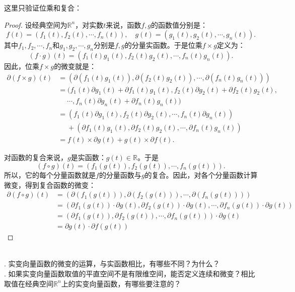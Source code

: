 \documentclass[12pt,UTF8]{ctexbook}
\begin{document}
这里只验证位乘和复合：
\begin{proof}
    设经典空间为$\mathbb{R}^n$，对实数$t$来说，函数$f,g$的函数值分别是：
    $$ f(t) = (f_1(t), f_2(t), \cdots, f_n(t)), \quad g(t) = (g_1(t), g_2(t), \cdots, g_n(t)). $$
    其中$f_1, f_2, \cdots, f_n$和$g_1, g_2, \cdots, g_n$分别是$f,g$的分量实函数。于是位乘$f \times g$定义为：
    $$ (f \cdot g)(t) = (f_1(t)g_1(t), f_2(t)g_2(t), \cdots, f_n(t)g_n(t)). $$
    因此，位乘$f\times g$的微变就是：
    \begin{align*}
        \partial (f \times g)(t) &= (\partial (f_1(t)g_1(t)), \partial (f_2(t)g_2(t)), \cdots, \partial (f_n(t)g_n(t))) \\
        &= (f_1(t)\partial g_1(t) + \partial f_1(t) g_1(t), f_2(t)\partial g_2(t) + \partial f_2(t) g_2(t), \\
        &\;\quad \cdots, f_n(t)\partial g_n(t) + \partial f_n(t) g_n(t)) \\
        &= (f_1(t)\partial g_1(t), f_2(t)\partial g_2(t), \cdots, f_n(t)\partial g_n(t)) \\
        &\;\quad + (\partial f_1(t) g_1(t), \partial f_2(t) g_2(t), \cdots, \partial f_n(t) g_n(t)) \\
        &= f(t) \times \partial g(t) + g(t) \times \partial f(t).
    \end{align*}

    对函数的复合来说，$g$是实函数：$g(t)\in\mathbb{R}$。于是
    $$ (f \circ g) (t) = (f_1(g(t)), f_2(g(t)), \cdots, f_n(g(t))). $$
    所以，它的每个分量函数就是$f$的分量函数与$g$的复合。因此，对各个分量函数计算微变，得到复合函数的微变：
    \begin{align*}
        \partial (f \circ g) (t) &= (\partial (f_1(g(t))), \partial (f_2(g(t))), \cdots, \partial (f_n(g(t)))) \\
        &= (\partial f_1(g(t)) \cdot \partial g(t), \partial f_2(g(t)) \cdot \partial g(t), \cdots, \partial f_n(g(t)) \cdot \partial g(t)) \\
        &= (\partial f_1(g(t)), \partial f_2(g(t)), \cdots, \partial f_n(g(t)) ) \cdot \partial g(t) \\
        &=  \partial g(t) \cdot \partial f(g(t))
    \end{align*}
    
\end{proof}

\begin{sk}
    \mbox{} \\
    . 实变向量函数的微变的运算，与实函数相比，有哪些不同？为什么？\\
    . 如果实变向量函数取值的平直空间不是有限维空间，能否定义连续和微变？相比取值在经典空间$\mathbb{R}^n$上的实变向量函数，有哪些要注意的？
\end{sk}
\end{document}
